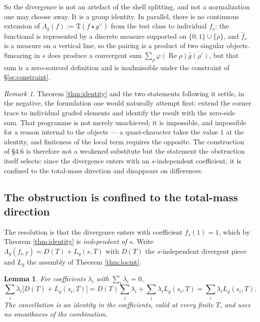 \documentclass[11pt]{amsart}
\newtheorem{lemma}[theorem]{Lemma}
\theoremstyle{definition}
\theoremstyle{remark}
\newtheorem{remark}[theorem]{Remark}
\newcommand{\Rel}{\operatorname{Re}}
\begin{document}
So the divergence is not an artefact of the shell splitting, and not a
normalization one may choose away.  It is a group identity.  In parallel,
there is no continuous extension of $\Lambda_g(f):=\mathfrak T(f\star
g^\vee)$ from the test class to individual $f_s$: the functional is
represented by a discrete measure supported on $\{0,1\}\cup\{\rho\}$, and
$\widehat f_s$ is a measure on a vertical line, so the pairing is a product
of two singular objects.  Smearing in $s$ does produce a convergent sum
$\sum_\rho\varphi(\Rel\rho)\overline{\widehat g(\rho')}$, but that sum is a
zero-sourced definition and is inadmissible under the constraint of
\S\ref{ss:constraint}.

\begin{remark}\label{rem:replaces}
Theorem \ref{thm:identity} and the two statements following it settle, in the
negative, the formulation one would naturally attempt first: extend the
corner trace to individual graded elements and identify the result with the
zero-side sum.  That programme is not merely unachieved; it is impossible,
and impossible for a reason internal to the objects --- a quasi-character
takes the value $1$ at the identity, and finiteness of the local term
requires the opposite.  The construction of \S4.6 is therefore not a
weakened substitute but the statement the obstruction itself selects: since
the divergence enters with an $s$-independent coefficient, it is confined to
the total-mass direction and disappears on differences.
\end{remark}

\subsection{The obstruction is confined to the total-mass direction}

The resolution is that the divergence enters with coefficient $f_s(1)=1$,
which by Theorem \ref{thm:identity} is \emph{independent of $s$}.  Write
$\Lambda_g(f_{s,T})=D(T)+L_g(s,T)$ with $D(T)$ the $s$-independent divergent
piece and $L_g$ the assembly of Theorem \ref{thm:locint}.

\begin{lemma}\label{lem:cancel}
For coefficients $\lambda_i$ with $\sum_i\lambda_i=0$,
\[
 \sum_i\lambda_i\big[D(T)+L_g(s_i,T)\big]
 =D(T)\sum_i\lambda_i+\sum_i\lambda_iL_g(s_i,T)
 =\sum_i\lambda_iL_g(s_i,T).
\]
The cancellation is an identity in the coefficients, valid at every finite
$T$, and uses no smoothness of the combination.
\end{lemma}
\end{document}
